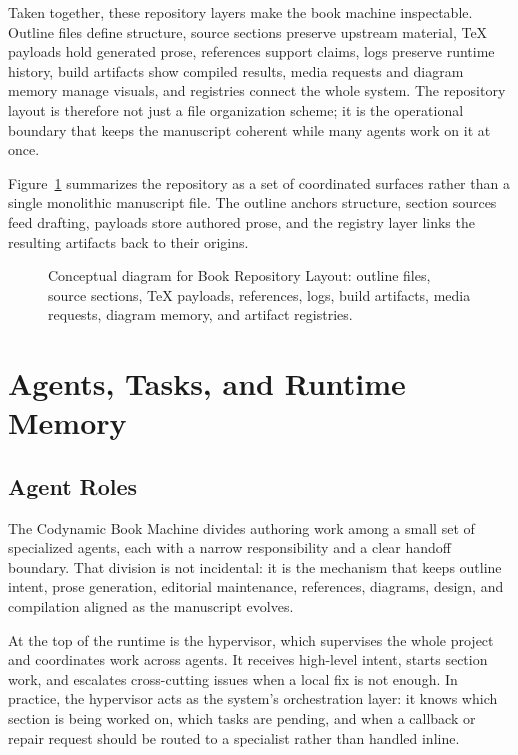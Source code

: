 \documentclass[11pt]{article}
\begin{document}
Taken together, these repository layers make the book machine inspectable. Outline files define structure, source sections preserve upstream material, \TeX{} payloads hold generated prose, references support claims, logs preserve runtime history, build artifacts show compiled results, media requests and diagram memory manage visuals, and registries connect the whole system. The repository layout is therefore not just a file organization scheme; it is the operational boundary that keeps the manuscript coherent while many agents work on it at once.

Figure~\ref{fig:ch03_sec03_repository_layout} summarizes the repository as a set of coordinated surfaces rather than a single monolithic manuscript file. The outline anchors structure, section sources feed drafting, payloads store authored prose, and the registry layer links the resulting artifacts back to their origins.

\begin{figure}[htbp]
\centering

\caption{Conceptual diagram for Book Repository Layout: outline files, source sections, \TeX{} payloads, references, logs, build artifacts, media requests, diagram memory, and artifact registries.}
\label{fig:ch03_sec03_repository_layout}
\end{figure}



\section{Agents, Tasks, and Runtime Memory}

\subsection{Agent Roles}


The Codynamic Book Machine divides authoring work among a small set of specialized agents, each with a narrow responsibility and a clear handoff boundary. That division is not incidental: it is the mechanism that keeps outline intent, prose generation, editorial maintenance, references, diagrams, design, and compilation aligned as the manuscript evolves.

At the top of the runtime is the hypervisor, which supervises the whole project and coordinates work across agents. It receives high-level intent, starts section work, and escalates cross-cutting issues when a local fix is not enough. In practice, the hypervisor acts as the system's orchestration layer: it knows which section is being worked on, which tasks are pending, and when a callback or repair request should be routed to a specialist rather than handled inline.
\end{document}
